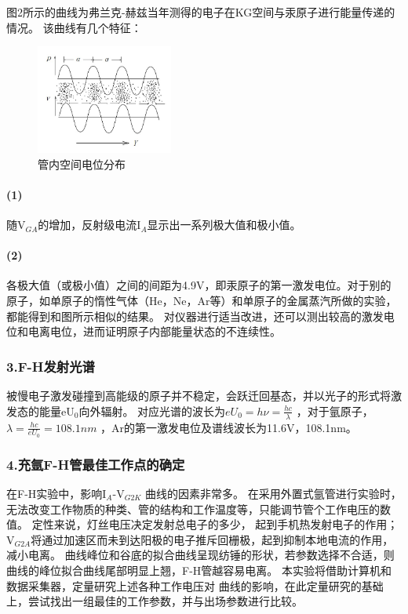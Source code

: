 \documentclass[12pt,a4paper,UTF8]{ctexart}
\begin{document}
	图2所示的曲线为弗兰克-赫兹当年测得的电子在KG空间与汞原子进行能量传递的情况。
	该曲线有几个特征：

	\begin{figure}[htbp]
		\centering
		\includegraphics[width=0.4\textwidth]{img//3.jpg}
		\caption{管内空间电位分布}
	\end{figure}


	\paragraph{(1)}
	随V$_{GA}$的增加，反射级电流I$_A$显示出一系列极大值和极小值。
	\paragraph{(2)}
	各极大值（或极小值）之间的间距为4.9V，即汞原子的第一激发电位。对于别的原子，如单原子的惰性气体（He，Ne，Ar等）和单原子的金属蒸汽所做的实验，都能得到和图所示相似的结果。
	对仪器进行适当改进，还可以测出较高的激发电位和电离电位，进而证明原子内部能量状态的不连续性。

	\subsubsection*{3.F-H发射光谱}	
	被慢电子激发碰撞到高能级的原子并不稳定，会跃迁回基态，并以光子的形式将激发态的能量eU$_{0}$向外辐射。
	对应光谱的波长为$eU_{0} = h\nu =\frac {hc}{\lambda }$ ，对于氩原子，$\lambda = \frac {hc}{eU_{0}}=108.1nm$ ，Ar的第一激发电位及谱线波长为11.6V，108.1nm。

	\subsubsection*{4.充氩F-H管最佳工作点的确定}
	在F-H实验中，影响I$_{A}$-V$_{G2K}$ 曲线的因素非常多。
	在采用外置式氩管进行实验时，无法改变工作物质的种类、管的结构和工作温度等，只能调节管个工作电压的数值。
	定性来说，灯丝电压决定发射总电子的多少， 起到手机热发射电子的作用；V$_{G2A}$将通过加速区而未到达阳极的电子推斥回栅极，起到抑制本地电流的作用，减小电离。
	曲线峰位和谷底的拟合曲线呈现纺锤的形状，若参数选择不合适，则 曲线的峰位拟合曲线尾部明显上翘，F-H管越容易电离。
	本实验将借助计算机和数据采集器，定量研究上述各种工作电压对 曲线的影响，在此定量研究的基础上，尝试找出一组最佳的工作参数，并与出场参数进行比较。
\end{document}
